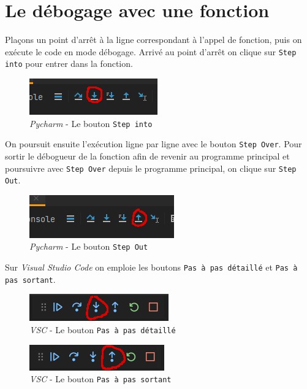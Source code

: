 \documentclass[a4paper,12pt]{book}
\begin{document}
\section{Le débogage avec une fonction}
Plaçons un point d'arrêt à la ligne correspondant à l'appel de fonction, puis on exécute le code en mode débogage. Arrivé au point d'arrêt on clique sur \texttt{Step into} pour entrer dans la fonction.
\begin{figure}[h]
\begin{center}
\includegraphics[scale=0.6]{IMG/Pycharm-09.png}
\caption{\textit{Pycharm} - Le bouton \texttt{Step into}}
\end{center}
\end{figure}
\medskip

On poursuit ensuite l'exécution ligne par ligne avec le bouton \texttt{Step Over}. Pour sortir le débogueur de la fonction afin de revenir au programme principal et poursuivre avec \texttt{Step Over} depuis le programme principal, on clique sur \texttt{Step Out}.
\begin{figure}[h]
\begin{center}
\includegraphics[scale=0.6]{IMG/Pycharm-10.png}
\caption{\textit{Pycharm} - Le bouton \texttt{Step Out}}
\end{center}
\end{figure}
\medskip

Sur \textit{Visual Studio Code} on emploie les boutons \texttt{Pas à pas détaillé} et \texttt{Pas à pas sortant}.
\begin{figure}[h]
\begin{center}
\includegraphics[scale=0.6]{IMG/VSC-04.png}
\caption{\textit{VSC} - Le bouton \texttt{Pas à pas détaillé}}
\end{center}
\end{figure}

\begin{figure}[h]
\begin{center}
\includegraphics[scale=0.6]{IMG/VSC-05.png}
\caption{\textit{VSC} - Le bouton \texttt{Pas à pas sortant}}
\end{center}
\end{figure}
\medskip
\end{document}
